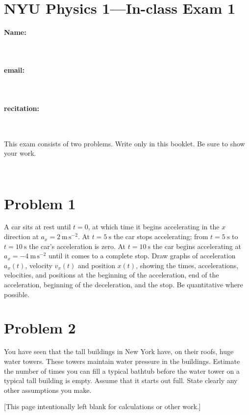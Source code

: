 \documentclass[12pt]{article}
\begin{document}
\section*{NYU Physics 1---In-class Exam 1}

\vfill

\paragraph{Name:} ~

\paragraph{email:} ~

\paragraph{recitation:} ~

\vfill

This exam consists of two problems.  Write only in this booklet.  Be
sure to show your work.

\vfill ~

\clearpage

\section*{Problem 1}

A car sits at rest until $t=0$, at which time it begins accelerating
in the $x$ direction at $a_x= 2~\mathrm{m\,s^{-2}}$.  At
$t=5~\mathrm{s}$ the car stops accelerating; from $t=5~\mathrm{s}$ to
$t=10~\mathrm{s}$ the car's acceleration is zero.  At
$t=10~\mathrm{s}$ the car begins accelerating at $a_x=
-4~\mathrm{m\,s^{-2}}$ until it comes to a complete stop.  Draw graphs
of acceleration $a_x(t)$, velocity $v_x(t)$ and position $x(t)$,
showing the times, accelerations, velocities, and positions at the
beginning of the acceleration, end of the acceleration, beginning of
the deceleration, and the stop.  Be quantitative where possible.

\clearpage

\section*{Problem 2}

You have seen that the tall buildings in New York have, on their
roofs, huge water towers.  These towers maintain water pressure in the
buildings.  Estimate the number of times you can fill a typical
bathtub before the water tower on a typical tall building is empty.
Assume that it starts out full.  State clearly any other assumptions
you make.

\clearpage

[This page intentionally left blank for calculations or other work.]
\end{document}
